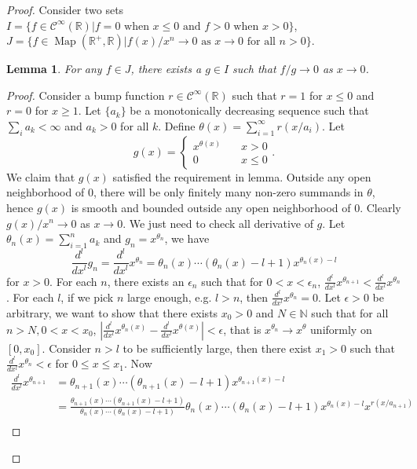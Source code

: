 \documentclass[12pt]{amsart}
\newtheorem{lem}[thm]{Lemma}
\theoremstyle{definition}
\theoremstyle{remark}
\numberwithin{equation}{section}
\newcommand{\cinf}{{\mathcal C}^{\infty}}
\newcommand{\R}{{\mathbb{R}}}
\newcommand{\N}{{\mathbb{N}}}
\newcommand{\1}{{\mathbb{1}}}
\newcommand{\map}{\operatorname{Map}}
\begin{document}
 	\begin{proof}
 		Consider two sets $I = \{f\in \cinf(\R)|\text{$f=0$ when $x\le 0$ and $f> 0$ when $x> 0$} \}$, $J = \{f\in \map(\R^+, \R)| \text{$f(x)/x^n \to 0$ as $x\to 0$ for all $n>0$}\}$.
 		
 		\begin{lem} For any $f\in J$, there exists a $g\in I$ such that $f/g\to 0$ as $x\to 0$.
 			\end{lem}
 		\begin{proof}
 			Consider a bump function $r\in \cinf(\R)$ such that $r= 1$ for $x\le 0$ and $r=0$ for $x \ge 1$. Let $\{a_k\}$ be a monotonically decreasing sequence such that $\sum_i a_k < \infty$ and $a_k>0$ for all $k$. Define $\theta(x) = \sum_{i=1}^{\infty} r(x/a_i)$. Let 
 			\begin{equation}
 			g(x) = \begin{cases}
 			x^{\theta(x)} \quad &x>0\\
 			0 &x\le 0
 			\end{cases}.
 			\end{equation}
 			We claim that $g(x)$ satisfied the requirement in lemma. Outside any open neighborhood of $0$, there will be only finitely many non-zero summands in $\theta$, hence $g(x)$ is smooth and bounded outside any open neighborhood of $0$. Clearly $g(x)/x^n\to 0$ as $x\to 0$. We just need to check all derivative of $g$. Let $\theta_n(x) = \sum_{i=1}^n a_k$ and $g_n = x^{\theta_n}$, we have 
 			$$
 			\frac{d^l}{dx^l}g_n =\frac{d^l}{dx^l} x^{\theta_n} = \theta_n(x)\cdots(\theta_n(x)-l+1) x^{\theta_n(x) - l}
 			$$
 			for $x>0$. For each $n$, there exists an $\epsilon_n$ such that for $0<x<\epsilon_n$, $\frac{d^l}{dx^l} x^{\theta_{n+1}}<\frac{d^l}{dx^l} x^{\theta_n}$. For each $l$, if we pick $n$ large enough, e.g. $l >n$, then $\frac{d^l}{dx^l} x^{\theta_n} = 0$. Let $\epsilon>0$ be arbitrary, we want to show that there exists  $x_0>0$ and $N\in \N$ such that for all $n>N, 0<x<x_0$, $|\frac{d^l}{dx^l} x^{\theta_n(x)}-\frac{d^l}{dx^l} x^{\theta(x)}| < \epsilon$, that is $x^{\theta_n}\to x^{\theta}$ uniformly on $[0, x_0]$. Consider $n>l$ to be sufficiently large, then there exist $x_1> 0$ such that $\frac{d^l}{dx^l} x^{\theta_n} < \epsilon$ for $0\le x \le x_1$. Now
 			\begin{align*}
 				\frac{d^l}{dx^l} x^{\theta_{n+1}}& = \theta_{n+1}(x)\cdots(\theta_{n+1}(x)-l+1) x^{\theta_{n+1}(x) - l}\\
 				& =\frac{\theta_{n+1}(x)\cdots(\theta_{n+1}(x)-l+1)}{\theta_n(x)\cdots(\theta_n(x)-l+1)}\theta_n(x)\cdots(\theta_n(x)-l+1) x^{\theta_n(x) - l}x^{r(x/a_{n+1})} \\

\end{align*}
\end{proof}
\end{proof}
\end{document}
